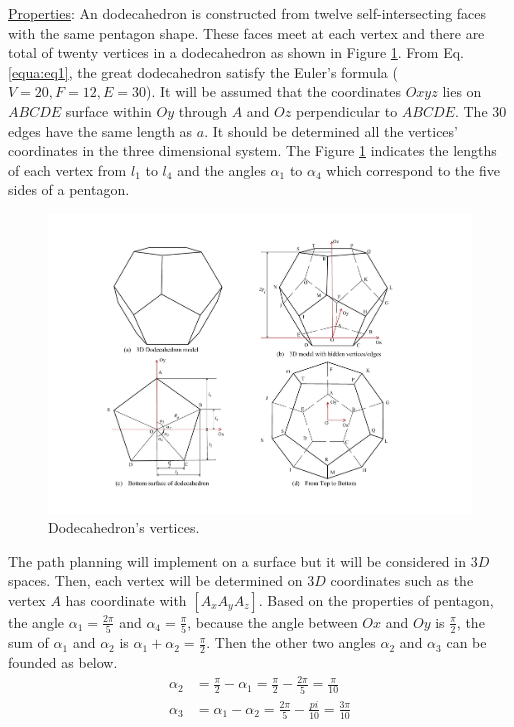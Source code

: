 \noindent\uline{Properties}: 
An dodecahedron is constructed from twelve self-intersecting faces with the same pentagon shape. These faces meet at each vertex and there are total of twenty vertices in a dodecahedron as shown in Figure \ref{fig:dodecahedron2}.
%
From Eq. \ref{equa:eq1}, the great dodecahedron satisfy the Euler's formula ($V=20, F=12, E=30$).
%
It will be assumed that the coordinates $Oxyz$ lies on $ABCDE$ surface within $Oy$ through $A$ and $Oz$ perpendicular to $ABCDE$.
%
The 30 edges have the same length as $a$. It should be determined all the vertices' coordinates in the three dimensional system.
%
The Figure \ref{fig:dodecahedron2} indicates the lengths of each vertex from $l_1$ to $l_4$ and the angles $\alpha_1$ to $\alpha_4$ which correspond to the five sides of a pentagon.

\begin{figure}[h]
\centering
	\includegraphics[width=1\textwidth]{image/dodecahedron2.pdf}
	\caption{Dodecahedron's vertices.}
	\label{fig:dodecahedron2}
\end{figure}

\noindent The path planning will implement on a surface but it will be considered in $3D$ spaces. 
Then, each vertex will be determined on $3D$ coordinates such as the vertex $A$ has coordinate with $[A_x A_y A_z]$. 
Based on the properties of pentagon, the angle $\alpha_1=\frac{2\pi}{5}$ and $\alpha_4=\frac{\pi}{5}$, 
because the angle between $Ox$ and $Oy$ is $\frac{\pi}{2}$, the sum of $\alpha_1$ and $\alpha_2$ is $\alpha_1 + \alpha_2 = \frac{\pi}{2}$. 
Then the other two angles $\alpha_2$ and $\alpha_3$ can be founded as below. 
\begin{equation*} 
\label{equa:eq0}
\begin{split}
\alpha_2 &= \frac{\pi}{2}-\alpha_1 = \frac{\pi}{2}-\frac{2\pi}{5} = \frac{\pi}{10}\\ 
\alpha_3 &= \alpha_1-\alpha_2 = \frac{2\pi}{5}-\frac{pi}{10} = \frac{3\pi}{10}
\end{split}
\end{equation*}

